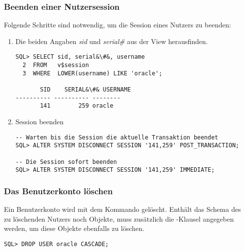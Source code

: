         \subsubsection{Beenden einer Nutzersession}
        \label{kill_user}
          Folgende Schritte sind notwendig, um die Session eines Nutzers zu beenden:
          \begin{enumerate}
            \item Die beiden Angaben \textit{sid} und \textit{serial\#} aus der View  herausfinden.
            \begin{lstlisting}[caption={Abfragen von sid und
            serial\#},label=admin204,language=oracle_sql]
SQL> SELECT sid, serial&\#&, username
  2  FROM   v$session
  3  WHERE  LOWER(username) LIKE 'oracle';

       SID    SERIAL&\#& USERNAME
---------- ---------- --------
       141        259 oracle
            \end{lstlisting}
            \item Session beenden
            \begin{lstlisting}[caption={Beenden einer
            Nutzersession},label=admin205,language=oracle_sql]
-- Warten bis die Session die aktuelle Transaktion beendet
SQL> ALTER SYSTEM DISCONNECT SESSION '141,259' POST_TRANSACTION;

-- Die Session sofort beenden
SQL> ALTER SYSTEM DISCONNECT SESSION '141,259' IMMEDIATE;
            \end{lstlisting}
          \end{enumerate}
          \begin{literaturinternet}
            \item \cite{sthref938}
          \end{literaturinternet}
        \subsubsection{Das Benutzerkonto l\"oschen}
          Ein Benutzerkonto wird mit dem Kommando  gel\"oscht. Enth\"alt das Schema des zu l\"oschenden Nutzers noch Objekte, muss zus\"atzlich die -Klausel angegeben werden, um diese Objekte ebenfalls zu l\"oschen.
          \begin{lstlisting}[caption={Das DROP USER
          Statement},label=admin206,language=oracle_sql]
SQL> DROP USER oracle CASCADE;
          \end{lstlisting}
          \begin{literaturinternet}
            \item \cite{DBSEG99791}
        \end{literaturinternet}
